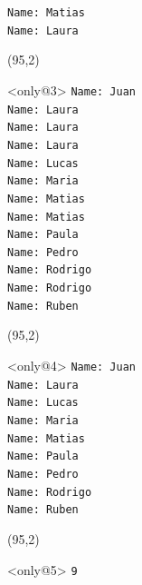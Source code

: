 \documentclass{beamer}
\begin{document}
\begin{frame}[fragile,t]
\begin{textblock}{25}
\begin{block}
    \verb;Name: Matias;\\
    \verb;Name: Laura;\\
    \vspace*{0.5ex}
    \end{block}
    \end{textblock}
    \begin{textblock}{25}(95,2)
    \begin{block}<only@3>{\vspace*{-3ex}}
    \scriptsize
    \verb;Name: Juan;\\
    \verb;Name: Laura;\\
    \verb;Name: Laura;\\
    \verb;Name: Laura;\\
    \verb;Name: Lucas;\\
    \verb;Name: Maria;\\
    \verb;Name: Matias;\\
    \verb;Name: Matias;\\
    \verb;Name: Paula;\\
    \verb;Name: Pedro;\\
    \verb;Name: Rodrigo;\\
    \verb;Name: Rodrigo;\\
    \verb;Name: Ruben;\\
    \vspace*{0.5ex}
    \end{block}
    \end{textblock}
    \begin{textblock}{25}(95,2)
    \begin{block}<only@4>{\vspace*{-3ex}}
    \scriptsize
    \verb;Name: Juan;\\
    \verb;Name: Laura;\\
    \verb;Name: Lucas;\\
    \verb;Name: Maria;\\
    \verb;Name: Matias;\\
    \verb;Name: Paula;\\
    \verb;Name: Pedro;\\
    \verb;Name: Rodrigo;\\
    \verb;Name: Ruben;\\
    \vspace*{0.5ex}
    \end{block}
    \end{textblock}
    \begin{textblock}{25}(95,2)
    \begin{block}<only@5>{\vspace*{-3ex}}
    \scriptsize
    \verb;9;\\
    \vspace*{0.5ex}
    \end{block}
    \end{textblock}
\end{frame}
\end{document}
